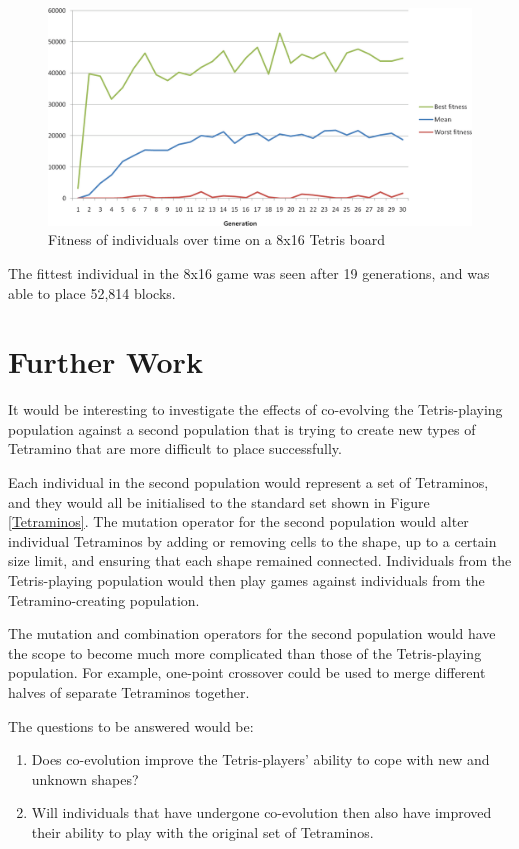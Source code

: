 \documentclass[a4paper,12pt]{article}
\begin{document}
\begin{figure}[h]
  \centering
  \includegraphics[width=\graphwidth]{results/8x16.png}
  \caption{Fitness of individuals over time on a 8x16 Tetris board}
  \label{Medium}
\end{figure}

The fittest individual in the 8x16 game was seen after 19 generations, and
was able to place 52,814 blocks.

\section{Further Work}

It would be interesting to investigate the effects of co-evolving the
Tetris-playing population against a second population that is trying to create
new types of Tetramino that are more difficult to place successfully.

Each individual in the second population would represent a set of Tetraminos,
and they would all be initialised to the standard set shown in Figure
\ref{Tetraminos}.
The mutation operator for the second population would alter individual
Tetraminos by adding or removing cells to the shape, up to a certain size limit,
and ensuring that each shape remained connected.
Individuals from the Tetris-playing population would then play games against
individuals from the Tetramino-creating population.

The mutation and combination operators for the second population would have the
scope to become much more complicated than those of the Tetris-playing
population.
For example, one-point crossover could be used to merge different halves of
separate Tetraminos together.

The questions to be answered would be:

\begin{enumerate}
  \item Does co-evolution improve the Tetris-players' ability to cope with new
      and unknown shapes?
  \item Will individuals that have undergone co-evolution then also have
      improved their ability to play with the original set of Tetraminos.
\end{enumerate}
\end{document}
